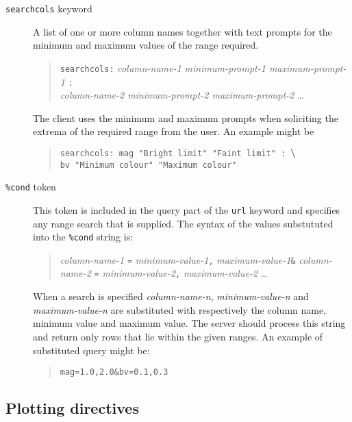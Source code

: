 \documentclass[twoside,11pt]{article}
\renewcommand{\_}{\texttt{\symbol{95}}}
\begin{document}
\begin{description}

  \item[{\tt search\_cols} keyword] A list of one or more column names
   together with text prompts for the minimum and maximum values of the
   range required.

  \begin{quote}
   {\tt search\_cols:} {\it column-name-1 minimum-prompt-1 maximum-prompt-1}
   {\tt :} \\
   {\it column-name-2 minimum-prompt-2 maximum-prompt-2} \ldots
  \end{quote}

   The client uses the minimum and maximum prompts when soliciting the
   extrema of the required range from the user.  An example might be

  \begin{quote}
   {\tt search\_cols: mag "Bright limit" "Faint limit" : ${\tt \backslash}$ \\
   b\_v "Minimum colour" "Maximum colour"}
  \end{quote}

  \item[{\tt \%cond} token] This token is included in the query part
   of the {\tt url} keyword and specifies any range search that is
   supplied.  The syntax of the values substututed into the {\tt \%cond}
   string is:

  \begin{quote}
   {\it column-name-1}\/ {\tt =} {\it minimum-value-1}{\tt ,}{\it
   maximum-value-1}{\tt \&}
   {\it column-name-2}\/ {\tt =} {\it minimum-value-2}{\tt ,}{\it
   maximum-value-2} \ldots
  \end{quote}

   When a search is specified {\it column-name-n}, {\it minimum-value-n}\/
   and  {\it maximum-value-n}\/ are substituted with respectively the column
   name, minimum value and maximum value.  The server should process this
   string and return only rows that lie within the given ranges.  An
   example of substituted query might be:

  \begin{quote}
   {\tt mag=1.0,2.0\&b\_v=0.1,0.3}
  \end{quote}

\end{description}

\subsection{\label{PLOTTING_R}Plotting directives}
\end{document}
